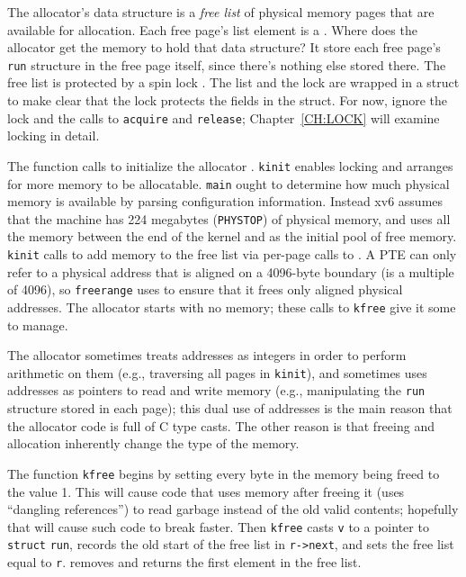 The allocator's data structure is a
\textit{free list}
of physical memory pages that are available
for allocation.
Each free page's list element is a
.
Where does the allocator get the memory
to hold that data structure?
It store each free page's
\lstinline{run}
structure in the free page itself,
since there's nothing else stored there.
The free list is
protected by a spin lock
.
The list and the lock are wrapped in a struct
to make clear that the lock protects the fields
in the struct.
For now, ignore the lock and the calls to
\lstinline{acquire}
and
\lstinline{release};
Chapter~\ref{CH:LOCK} will examine
locking in detail.

The function
calls
to initialize the allocator
.
\lstinline{kinit}
enables locking and arranges for more memory to be allocatable.
\lstinline{main}
ought to determine how much physical
memory is available by parsing configuration information.
Instead xv6 assumes that the machine has
224 megabytes
(\lstinline{PHYSTOP})
of physical memory, and uses all the memory between the end of the kernel
and
as the initial pool of free memory.
\lstinline{kinit}
calls
to add memory to the free list via per-page calls to
.
A PTE can only refer to a physical address that is aligned
on a 4096-byte boundary (is a multiple of 4096), so
\lstinline{freerange}
uses
to ensure that it frees only aligned physical addresses.
The allocator starts with no memory;
these calls to
\lstinline{kfree}
give it some to manage.

The allocator sometimes treats addresses as integers
in order to perform arithmetic on them (e.g.,
traversing all pages in
\lstinline{kinit}),
and sometimes uses addresses as pointers to read and
write memory (e.g., manipulating the
\lstinline{run}
structure stored in each page);
this dual use of addresses is the main reason that the
allocator code is full of C type casts.
The other reason is that freeing and allocation inherently
change the type of the memory.

The function
\lstinline{kfree}
begins by setting every byte in the
memory being freed to the value 1.
This will cause code that uses memory after freeing it
(uses ``dangling references'')
to read garbage instead of the old valid contents;
hopefully that will cause such code to break faster.
Then
\lstinline{kfree}
casts
\lstinline{v}
to a pointer to
\lstinline{struct}
\lstinline{run},
records the old start of the free list in
\lstinline{r->next},
and sets the free list equal to
\lstinline{r}.
removes and returns the first element in the free list.

